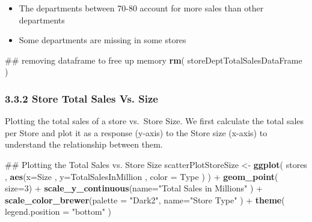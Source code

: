 \documentclass[]{article}
\newenvironment{Shaded}{\begin{snugshade}}{\end{snugshade}}
\newcommand{\KeywordTok}[1]{\textcolor[rgb]{0.13,0.29,0.53}{\textbf{{#1}}}}
\newcommand{\DataTypeTok}[1]{\textcolor[rgb]{0.13,0.29,0.53}{{#1}}}
\newcommand{\DecValTok}[1]{\textcolor[rgb]{0.00,0.00,0.81}{{#1}}}
\newcommand{\StringTok}[1]{\textcolor[rgb]{0.31,0.60,0.02}{{#1}}}
\newcommand{\NormalTok}[1]{{#1}}
\begin{document}
\begin{itemize}
\itemsep1pt\parskip0pt
\item
  The departments between 70-80 account for more sales than other
  departments
\item
  Some departments are missing in some stores
\end{itemize}

\begin{Shaded}
\begin{Highlighting}[]
\NormalTok{## removing dataframe to free up memory}
\KeywordTok{rm}\NormalTok{( storeDeptTotalSalesDataFrame )}
\end{Highlighting}
\end{Shaded}

\subsubsection{3.3.2 Store Total Sales Vs.
Size}\label{store-total-sales-vs.-size}

Plotting the total sales of a store vs.~Store Size. We first calculate
the total sales per Store and plot it as a response (y-axis) to the
Store size (x-axis) to understand the relationship between them.

\begin{Shaded}
\end{Shaded}

\begin{Shaded}
\begin{Highlighting}[]
\NormalTok{## Plotting the Total Sales vs. Store Size}
\NormalTok{scatterPlotStoreSize <-}\StringTok{ }\KeywordTok{ggplot}\NormalTok{( stores , }\KeywordTok{aes}\NormalTok{(}\DataTypeTok{x=}\NormalTok{Size , }\DataTypeTok{y=}\NormalTok{TotalSalesInMillion , }\DataTypeTok{color =} \NormalTok{Type ) ) +}\StringTok{ }
\StringTok{  }\KeywordTok{geom_point}\NormalTok{( }\DataTypeTok{size=}\DecValTok{3}\NormalTok{) +}\StringTok{  }
\StringTok{  }\KeywordTok{scale_y_continuous}\NormalTok{(}\DataTypeTok{name=}\StringTok{"Total Sales in Millions"} \NormalTok{) +}\StringTok{ }
\StringTok{  }\KeywordTok{scale_color_brewer}\NormalTok{(}\DataTypeTok{palette =} \StringTok{"Dark2"}\NormalTok{, }\DataTypeTok{name=}\StringTok{"Store Type"} \NormalTok{) +}
\StringTok{  }\KeywordTok{theme}\NormalTok{( }\DataTypeTok{legend.position =} \StringTok{"bottom"} \NormalTok{)}
\end{Highlighting}
\end{Shaded}
\end{document}
